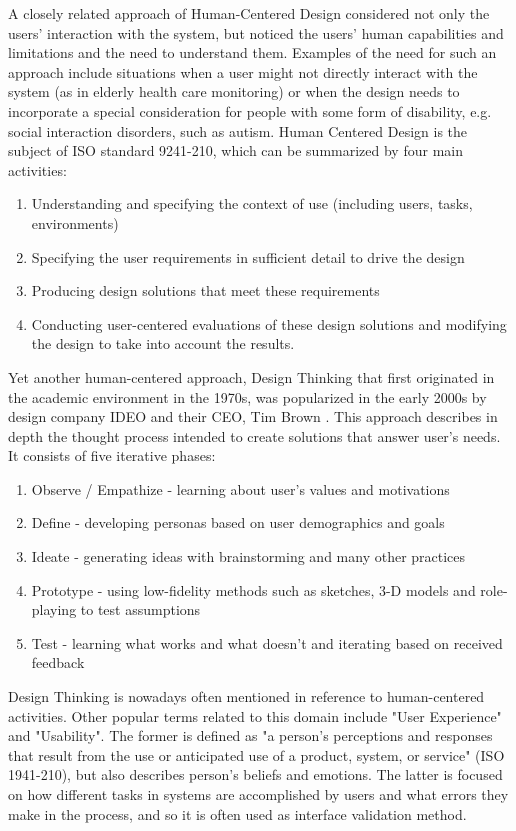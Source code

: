 \documentclass{article}
\begin{document}
A closely related approach of Human-Centered Design considered not only the users' interaction with the system, but noticed the users' human capabilities and limitations and the need to understand them. Examples of the need for such an approach include situations when a user might not directly interact with the system (as in elderly health care monitoring) or when the design needs to incorporate a special consideration for people with some form of disability, e.g. social interaction disorders, such as autism. Human Centered Design is the subject of ISO standard 9241-210, which can be summarized by four main activities:
\begin{enumerate}
  \item Understanding and specifying the context of use (including users, tasks, environments)
  \item Specifying the user requirements in sufficient detail to drive the design
  \item Producing design solutions that meet these requirements
  \item Conducting user-centered evaluations of these design solutions and modifying the design to take into account the results.
\end{enumerate}

Yet another human-centered approach, Design Thinking that first originated in the academic environment in the 1970s, was popularized in the early 2000s by design company IDEO and their CEO, Tim Brown \cite{brown2009change}. This approach describes in depth the thought process intended to create solutions that answer user's needs. It consists of five iterative phases:
\begin{enumerate}
    \item Observe / Empathize - learning about user's values and motivations
    \item Define - developing personas based on user demographics and goals
    \item Ideate - generating ideas with brainstorming and many other practices
    \item Prototype - using low-fidelity methods such as sketches, 3-D models and role-playing to test assumptions
    \item Test - learning what works and what doesn't and iterating based on received feedback
\end{enumerate}
Design Thinking is nowadays often mentioned in reference to human-centered activities. Other popular terms related to this domain include "User Experience" and "Usability". The former is defined as "a person's perceptions and responses that result from the use or anticipated use of a product, system, or service" (ISO 1941-210), but also describes person's beliefs and emotions. The latter is focused on how different tasks in systems are accomplished by users and what errors they make in the process, and so it is often used as interface validation method. 
\end{document}
